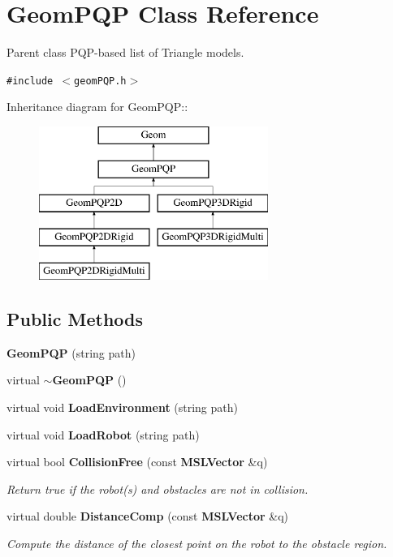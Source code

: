 \section{Geom\-PQP  Class Reference}
\label{classGeomPQP}
Parent class PQP-based list of Triangle models. 


{\tt \#include $<$geom\-PQP.h$>$}

Inheritance diagram for Geom\-PQP::\begin{figure}[H]
\begin{center}
\leavevmode
\includegraphics[height=5cm]{classGeomPQP}
\end{center}
\end{figure}
\subsection*{Public Methods}
\begin{CompactItemize}
\item 
{\bf Geom\-PQP} (string path)
\item 
virtual {\bf $\sim$Geom\-PQP} ()
\item 
virtual void {\bf Load\-Environment} (string path)
\item 
virtual void {\bf Load\-Robot} (string path)
\item 
virtual bool {\bf Collision\-Free} (const {\bf MSLVector} \&q)
\begin{CompactList}\small\item\em Return true if the robot(s) and obstacles are not in collision.\item\end{CompactList}\item 
virtual double {\bf Distance\-Comp} (const {\bf MSLVector} \&q)
\begin{CompactList}\small\item\em Compute the distance of the closest point on the robot to the obstacle region.\item\end{CompactList}\end{CompactItemize}
